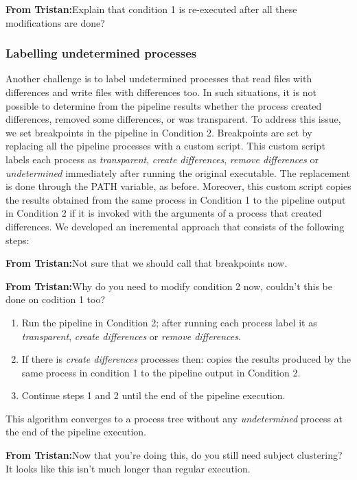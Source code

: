 \documentclass[a4paper,num-refs]{oup-contemporary}
\newcommand{\tristan}[1]{\color{blue}\textbf{From Tristan:}#1\color{black}}
\begin{document}
\tristan{Explain that condition 1 is re-executed after all these modifications are done?}

\subsubsection{Labelling undetermined processes} 

Another challenge is to label undetermined processes that read files with 
differences and write files with differences too. In such 
situations, it is not possible to determine from the pipeline results 
whether the process created differences, removed some differences, or 
was transparent.
To address this issue, we set breakpoints in the pipeline 
in Condition 2. Breakpoints are set by replacing all the pipeline 
processes with a custom script. This custom script labels each process 
as \emph{transparent}, \emph{create differences}, \emph{remove 
differences} or \emph{undetermined} immediately after running the original executable. 
The replacement is done through the PATH variable, as before. Moreover, 
this custom script copies the results obtained from the same process in 
Condition 1 to the pipeline output in Condition 2 if it is invoked with 
the arguments of a process that created differences. 
We developed an incremental approach that consists of the following steps: 

\tristan{Not sure that we should call that breakpoints now.}

\tristan{Why do you need to modify condition 2 now, couldn't this be done on codition 1 too?}

\begin{enumerate}
  \item Run the pipeline in Condition 2; after running each process 
  label it as \emph{transparent}, \emph{create differences} or
  \emph{remove differences}.
  
  \item If there is \emph{create differences} processes then: 
  copies the results produced by the same process in condition 1 to the 
  pipeline output in Condition 2. 
  
  \item Continue steps 1 and 2 until the end of the pipeline execution.
\end{enumerate}

This algorithm converges to a process tree without any 
\emph{undetermined} process at the end of the pipeline execution.

\tristan{Now that you're doing this, do you still need subject clustering? It looks like this isn't
much longer than regular execution.}
\end{document}
